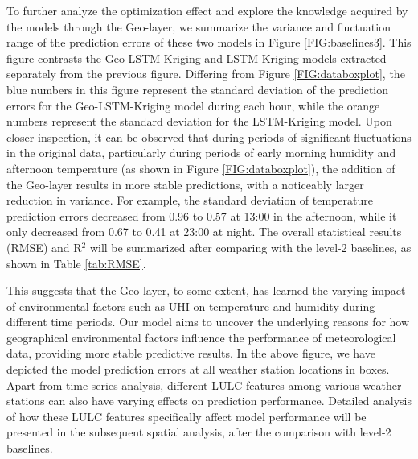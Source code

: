 \documentclass[a4paper,fleqn]{cas-sc}
\begin{document}
To further analyze the optimization effect and explore the knowledge acquired by the models through the Geo-layer, we summarize the variance and fluctuation range of the prediction errors of these two models in Figure \ref{FIG:baselines3}. This figure contrasts the Geo-LSTM-Kriging and LSTM-Kriging models extracted separately from the previous figure. Differing from Figure \ref{FIG:databoxplot}, the blue numbers in this figure represent the standard deviation of the prediction errors for the Geo-LSTM-Kriging model during each hour, while the orange numbers represent the standard deviation for the LSTM-Kriging model. Upon closer inspection, it can be observed that during periods of significant fluctuations in the original data, particularly during periods of early morning humidity and afternoon temperature (as shown in Figure \ref{FIG:databoxplot}), the addition of the Geo-layer results in more stable predictions, with a noticeably larger reduction in variance. For example, the standard deviation of temperature prediction errors decreased from 0.96 to 0.57 at 13:00 in the afternoon, while it only decreased from 0.67 to 0.41 at 23:00 at night. The overall statistical results (RMSE) and R$^2$ will be summarized after comparing with the level-2 baselines, as shown in Table \ref{tab:RMSE}. 

This suggests that the Geo-layer, to some extent, has learned the varying impact of environmental factors such as UHI on temperature and humidity during different time periods. Our model aims to uncover the underlying reasons for how geographical environmental factors influence the performance of meteorological data, providing more stable predictive results. In the above figure, we have depicted the model prediction errors at all weather station locations in boxes. Apart from time series analysis, different LULC features among various weather stations can also have varying effects on prediction performance. Detailed analysis of how these LULC features specifically affect model performance will be presented in the subsequent spatial analysis, after the comparison with level-2 baselines.
\end{document}
